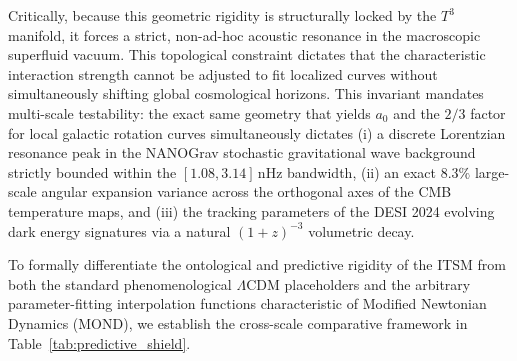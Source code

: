 \documentclass[aps,prd,10pt,onecolumn,superscriptaddress,nofootinbib]{revtex4-2}
\begin{document}
Critically, because this geometric rigidity is structurally locked by the $T^3$ manifold, it forces a strict, non-ad-hoc acoustic resonance in the macroscopic superfluid vacuum. This topological constraint dictates that the characteristic interaction strength cannot be adjusted to fit localized curves without simultaneously shifting global cosmological horizons. This invariant mandates multi-scale testability: the exact same geometry that yields $a_0$ and the $2/3$ factor for local galactic rotation curves simultaneously dictates (i) a discrete Lorentzian resonance peak in the NANOGrav stochastic gravitational wave background strictly bounded within the $[1.08, 3.14]\,\text{nHz}$ bandwidth, (ii) an exact $8.3\%$ large-scale angular expansion variance across the orthogonal axes of the CMB temperature maps, and (iii) the tracking parameters of the DESI 2024 evolving dark energy signatures via a natural $(1+z)^{-3}$ volumetric decay. 

To formally differentiate the ontological and predictive rigidity of the ITSM from both the standard phenomenological $\Lambda$CDM placeholders and the arbitrary parameter-fitting interpolation functions characteristic of Modified Newtonian Dynamics (MOND), we establish the cross-scale comparative framework in Table~\ref{tab:predictive_shield}.
\end{document}
